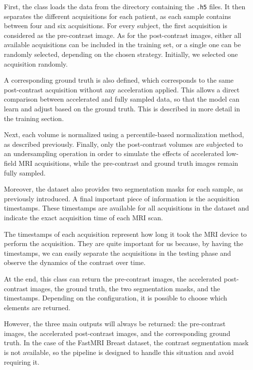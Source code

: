 \documentclass[12pt]{article}
\begin{document}
First, the class loads the data from the directory containing the \texttt{.h5} files. It then separates the different acquisitions for each patient, as each
sample contains between four and six acquisitions. For every subject, the first acquisition is considered as the pre-contrast image. As for the post-contrast images,
either all available acquisitions can be included in the training set, or a single one can be randomly selected, depending on the chosen strategy.
Initially, we selected one acquisition randomly.
\vspace{0.5cm}

A corresponding ground truth is also defined, which corresponds to the same post-contrast acquisition without any acceleration applied.
This allows a direct comparison between accelerated and fully sampled data, so that the model can learn and adjust based on the ground truth.
This is described in more detail in the training section.
\vspace{0.5cm}

Next, each volume is normalized using a percentile-based normalization method, as described previously.
Finally, only the post-contrast volumes are subjected to an undersampling operation in order to simulate the effects of accelerated low-field MRI acquisitions,
while the pre-contrast and ground truth images remain fully sampled.
\vspace{0.5cm}

Moreover, the dataset also provides two segmentation masks for each sample, as previously introduced. A final important piece of information is the acquisition timestamps.
These timestamps are available for all acquisitions in the dataset and indicate the exact acquisition time of each MRI scan.
\vspace{0.5cm}

The timestamps of each acquisition represent how long it took the MRI device to perform the acquisition.
They are quite important for us because, by having the timestamps, we can easily separate the acquisitions in the testing phase and observe the dynamics of the contrast over time.
\vspace{0.5cm}

At the end, this class can return the pre-contrast images, the accelerated post-contrast images, the ground truth, the two segmentation masks, and the timestamps.
Depending on the configuration, it is possible to choose which elements are returned.
\vspace{0.5cm}

However, the three main outputs will always be returned: the pre-contrast images, the accelerated post-contrast images, and the corresponding ground
truth. In the case of the FastMRI Breast dataset, the contrast segmentation mask is not available, so the pipeline is designed to handle this situation and
avoid requiring it.
\vspace{0.5cm}
\end{document}
